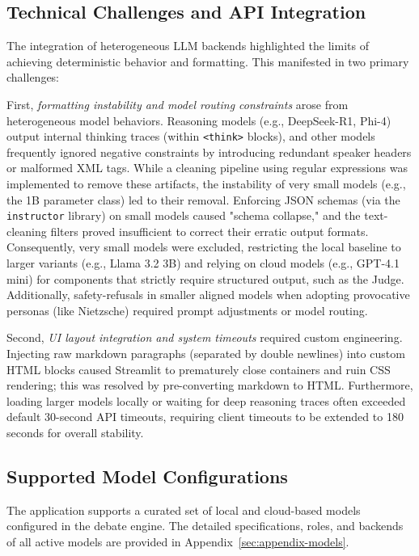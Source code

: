 \documentclass[11pt,a4paper]{article}
\begin{document}
\subsection{Technical Challenges and API Integration}

The integration of heterogeneous LLM backends highlighted the limits of achieving deterministic behavior and formatting. This manifested in two primary challenges:

First, \emph{formatting instability and model routing constraints} arose from heterogeneous model behaviors. Reasoning models (e.g., DeepSeek-R1, Phi-4) output internal thinking traces (within \texttt{<think>} blocks), and other models frequently ignored negative constraints by introducing redundant speaker headers or malformed XML tags. While a cleaning pipeline using regular expressions was implemented to remove these artifacts, the instability of very small models (e.g., the 1B parameter class) led to their removal. Enforcing JSON schemas (via the \texttt{instructor} library) on small models caused "schema collapse," and the text-cleaning filters proved insufficient to correct their erratic output formats. Consequently, very small models were excluded, restricting the local baseline to larger variants (e.g., Llama 3.2 3B) and relying on cloud models (e.g., GPT-4.1 mini) for components that strictly require structured output, such as the Judge. Additionally, safety-refusals in smaller aligned models when adopting provocative personas (like Nietzsche) required prompt adjustments or model routing.

Second, \emph{UI layout integration and system timeouts} required custom engineering. Injecting raw markdown paragraphs (separated by double newlines) into custom HTML blocks caused Streamlit to prematurely close containers and ruin CSS rendering; this was resolved by pre-converting markdown to HTML. Furthermore, loading larger models locally or waiting for deep reasoning traces often exceeded default 30-second API timeouts, requiring client timeouts to be extended to 180 seconds for overall stability.

\subsection{Supported Model Configurations}

The application supports a curated set of local and cloud-based models configured in the debate engine. The detailed specifications, roles, and backends of all active models are provided in Appendix~\ref{sec:appendix-models}.
\end{document}
